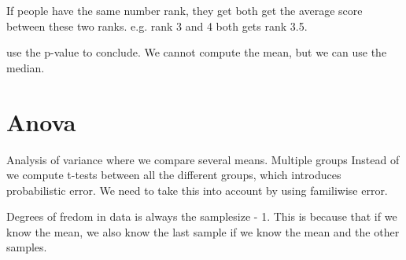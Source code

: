 \documentclass[a4paper]{article}
\begin{document}
If people have the same number rank, they get both get the average score between these two ranks. e.g. rank 3 and 4 both gets rank 3.5. 

use the p-value to conclude. We cannot compute the mean, but we can use the median.

\section{Anova}
Analysis of variance where we compare several means. Multiple groups
Instead of we compute t-tests between all the different groups, which introduces probabilistic error. We need to take this into account by using familiwise error.

Degrees of fredom in data is always the samplesize - 1. This is because that if we know the mean, we also know the last sample if we know the mean and the other samples.
\end{document}
